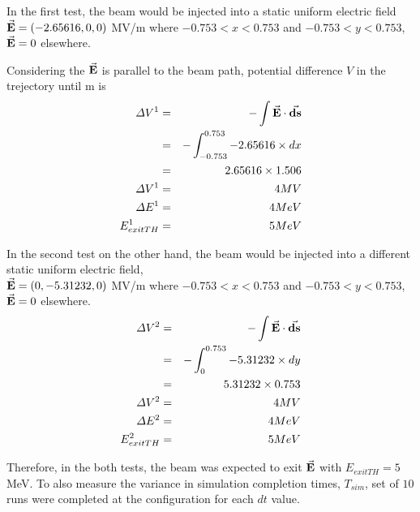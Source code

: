 \documentclass[a4paper,oneside,12pt]{report}
\numberwithin{equation}{chapter}
\begin{document}
In the first test, the beam would be injected into a static uniform electric field \\
$\vec{\textbf{E}}=(-2.65616, 0, 0)$ MV/m where $-0.753<x<0.753$ and $-0.753<y<0.753$, $\vec{\textbf{E}}=0$ elsewhere.

Considering the $\vec{\textbf{E}}$ is parallel to the beam path, potential difference $V$ in the trejectory until m is
\begin{eqnarray}
    \Delta V^1 &=& - \int \vec{\textbf{E}} \cdot \vec{\textbf{ds}} \\
             &=& - \int_{-0.753}^{0.753} -2.65616 \times dx \\
             &=& 2.65616 \times 1.506 \\
    \Delta V^1 &=& 4 MV \\
    \Delta E^1 &=& 4 MeV \\
    E_{exitTH}^1 &=& 5 MeV
\end{eqnarray}

In the second test on the other hand, the beam would be injected into a different static uniform electric field, \\
$\vec{\textbf{E}}=(0, -5.31232, 0)$ MV/m where $-0.753<x<0.753$ and $-0.753<y<0.753$, $\vec{\textbf{E}}=0$ elsewhere.
\begin{eqnarray}
    \Delta V^2   &=& - \int \vec{\textbf{E}} \cdot \vec{\textbf{ds}} \\
                 &=& - \int_{0}^{0.753} -5.31232 \times dy \\
                 &=& 5.31232 \times 0.753 \\
    \Delta V^2   &=& 4 MV \\
    \Delta E^2   &=& 4 MeV \\
    E_{exitTH}^2 &=& 5 MeV
\end{eqnarray}

Therefore, in the both tests, the beam was expected to exit $\vec{\textbf{E}}$ with $E_{exitTH} = 5$ MeV. 
To also measure the variance in simulation completion times, $T_{sim}$, set of $10$ runs were completed at the configuration for each $dt$ value.
\end{document}
